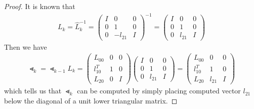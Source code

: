 \documentclass[11pt,a4paper]{article}
\begin{document}
\begin{proof}
    It is known that 
    \begin{align}
        L_k = \hat{L}_{k}^{-1} = 
       \left( \begin{array}{c|c|c} 
               I & 0 & 0 \\ \hline 
               0 & 1 & 0 \\ \hline
               0 & -l_{21} & I
           \end{array} \right)^{-1}
       =
       \left( \begin{array}{c|c|c} 
               I & 0 & 0 \\ \hline 
               0 & 1 & 0 \\ \hline
               0 & l_{21} & I
           \end{array} \right)
    \end{align}
    Then we have
    \begin{align} 
        \Lt_k = \Lt_{k-1} L_k  
        =  
        \left( \begin{array}{c|c|c} 
               L_{00} & 0 & 0 \\ \hline 
               l_{10}^T & 1 & 0 \\ \hline
               L_{20} & 0 & I
        \end{array} \right)
        \left( \begin{array}{c|c|c} 
               I & 0 & 0 \\ \hline 
               0 & 1 & 0 \\ \hline
               0 & l_{21} & I
           \end{array} \right)
       =  
       \left( \begin{array}{c|c|c} 
               L_{00} & 0 & 0 \\ \hline 
               l_{10}^T & 1 & 0 \\ \hline
               L_{20} & l_{21} & I
        \end{array} \right)
    \end{align}
    which tells us that $\Lt_k$ can be computed by simply placing computed
    vector $l_{21}$ below the diagonal of a unit lower triangular matrix.
\end{proof}
\newpage
\setcounter{section}{11}
\end{document}
